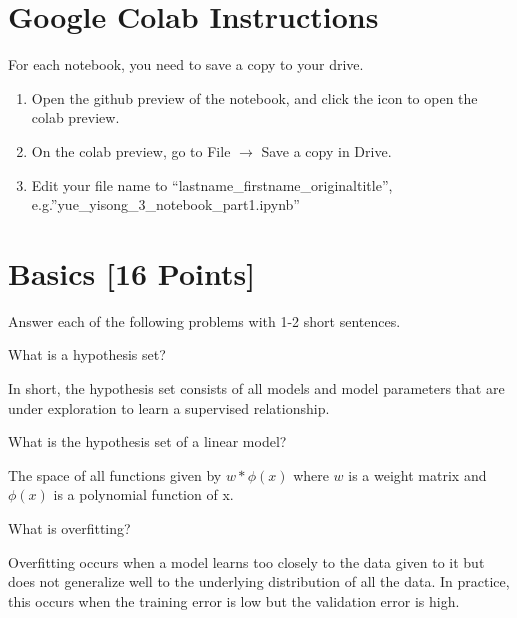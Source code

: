 \section*{Google Colab Instructions}

For each notebook, you need to save a copy to your drive.

\begin{enumerate}
	\item Open the github preview of the notebook, and click the icon to open the colab preview.
	\item On the colab preview, go to File $\rightarrow$ Save a copy in Drive.
	\item Edit your file name to “lastname_firstname_originaltitle”, e.g.”yue_yisong_3_notebook_part1.ipynb”
\end{enumerate}


\newpage
\section{Basics [16 Points]}

Answer each of the following problems with 1-2 short sentences.

\begin{problem}[2]
  What is a hypothesis set?
\end{problem}
\begin{solution}
  In short,  the hypothesis set consists of all models and model parameters that are under exploration to learn a supervised relationship.
\end{solution}

\begin{problem}[2]
  What is the hypothesis set of a linear model?
\end{problem}
\begin{solution}
  The space of all functions given by $w*\phi(x)$ where $w$ is a weight matrix and $\phi(x)$ is a polynomial function of x.
\end{solution}

\begin{problem}[2]
  What is overfitting?
\end{problem} 
\begin{solution}
  Overfitting occurs when a model learns too closely to the data given to it but does not generalize well to the underlying distribution of all the data. In practice, this occurs when the training error is low but the validation error is high.
\end{solution}

